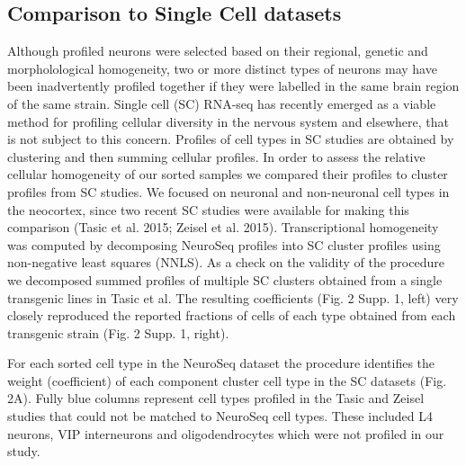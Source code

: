 \subsection{Comparison to Single Cell datasets}
Although profiled neurons were selected based on their regional, genetic and morpholological homogeneity, two or more distinct types of neurons may have been inadvertently profiled together if they were labelled in the same brain region of the same strain. Single cell (SC) RNA-seq has recently emerged as a viable method for profiling cellular diversity in the nervous system and elsewhere, that is not subject to this concern. Profiles of cell types in SC studies are obtained by clustering and then summing cellular profiles. In order to assess the relative cellular homogeneity of our sorted samples we compared their profiles to cluster profiles from SC studies. We focused on neuronal and non-neuronal cell types in the neocortex, since two recent SC studies were available for making this comparison (Tasic et al. 2015; Zeisel et al. 2015). Transcriptional homogeneity was computed by decomposing NeuroSeq profiles into SC cluster profiles using non-negative least squares (NNLS). As a check on the validity of the procedure we decomposed summed profiles of multiple SC clusters obtained from a single transgenic lines in Tasic et al. The resulting coefficients (Fig. 2 Supp. 1, left) very closely reproduced the reported fractions of cells of each type obtained from each transgenic strain (Fig. 2 Supp. 1, right).

For each sorted cell type in the NeuroSeq dataset the procedure identifies the weight (coefficient) of each component cluster cell type in the SC datasets (Fig. 2A). Fully blue columns represent cell types profiled in the Tasic and Zeisel studies that could not be matched to NeuroSeq cell types. These included L4 neurons, VIP interneurons and oligodendrocytes which were not profiled in our study. 